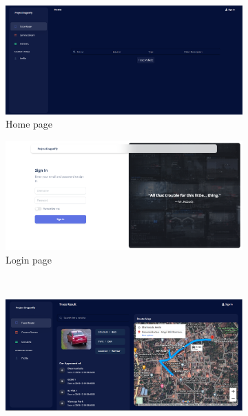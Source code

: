 \begin{figure}[!ht]
	\centering
	\begin{subfigure}[b]{0.48\linewidth}
		\centering
		\includegraphics[width=\linewidth]{Images/UI/home}
		\caption{Home page}
		\label{fig:home}
	\end{subfigure} \hfill
	\begin{subfigure}[b]{0.48\linewidth}
		\centering
		\includegraphics[width=\linewidth]{Images/UI/login}
		\caption{Login page}
		\label{fig:login}
	\end{subfigure} \\ \vspace{3mm}
	\begin{subfigure}[b]{0.48\linewidth}
		\centering
		\includegraphics[width=\linewidth]{Images/UI/result}

\end{subfigure}
\end{figure}
